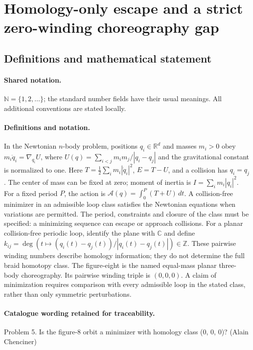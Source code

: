 \documentclass[11pt]{article}
\begin{document}
\section{Homology-only escape and a strict zero-winding choreography gap}\label{statement}

\subsection{Definitions and mathematical statement}

\paragraph{Shared notation.}$\mathbb N=\{1,2,\ldots\}$; the standard number fields have their usual meanings. All additional conventions are stated locally.


\paragraph{Definitions and notation.}In the Newtonian $n$-body problem, positions $q_i\in\mathbb R^d$ and masses $m_i>0$ obey $m_i\ddot q_i=\nabla_{q_i}U$, where $U(q)=\sum_{i<j}m_im_j/|q_i-q_j|$ and the gravitational constant is normalized to one. Here $T=\tfrac12\sum_i m_i|\dot q_i|^2$, $E=T-U$, and a collision has $q_i=q_j$. The center of mass can be fixed at zero; moment of inertia is $I=\sum_i m_i|q_i|^2$. For a fixed period $P$, the action is $\mathcal A(q)=\int_0^P(T+U)\,dt$. A collision-free minimizer in an admissible loop class satisfies the Newtonian equations when variations are permitted. The period, constraints and closure of the class must be specified: a minimizing sequence can escape or approach collisions. For a planar collision-free periodic loop, identify the plane with $\mathbb C$ and define $k_{ij}=\deg(t\mapsto(q_i(t)-q_j(t))/|q_i(t)-q_j(t)|)\in\mathbb Z$. These pairwise winding numbers describe homology information; they do not determine the full braid homotopy class. The figure-eight is the named equal-mass planar three-body choreography. Its pairwise winding triple is $(0,0,0)$. A claim of minimization requires comparison with every admissible loop in the stated class, rather than only symmetric perturbations.

\paragraph{Catalogue wording retained for traceability.}
Problem 5. Is the figure-8 orbit a minimizer with homology class (0, 0, 0)? (Alain Chenciner)
\end{document}
